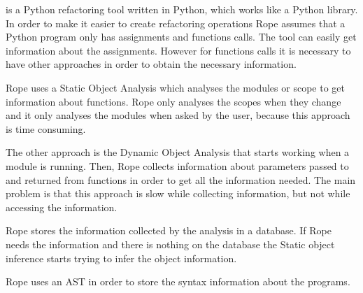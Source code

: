  is a Python refactoring tool written in Python, which works like a Python library.
In order to make it easier to create refactoring operations Rope assumes that a Python program only has assignments and functions calls. %
The tool can easily get information about the assignments. 
However for functions calls it is necessary to have other approaches in order to obtain the necessary information. 

Rope uses a Static Object Analysis which analyses the modules or scope to get information about functions. 
Rope only analyses the scopes when they change and it only analyses the modules when asked by the user, because this approach is time consuming. 

The other approach is the Dynamic Object Analysis that starts working when a module is running. 
Then, Rope collects information about parameters passed to and returned from functions in order to get all the information needed. 
The main problem is that this approach is slow while collecting information, but not while accessing the information.

Rope stores the information collected by the analysis in a database. 
If Rope needs the information and there is nothing on the database the Static object inference starts trying to infer the object information.

Rope uses an AST in order to store the syntax information about the programs.









